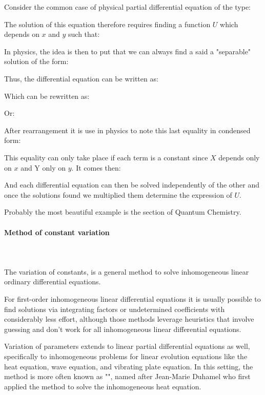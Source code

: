 	Consider the common case of physical partial differential equation of the type:
	
	The solution of this equation therefore requires finding a function $U$ which depends on $x$ and $y$ such that:
	
	In physics, the idea is then to put that we can always find a said a "separable" solution of the form:
	
	Thus, the differential equation can be written as:
	
	Which can be rewritten as:
	
	Or:
	
	After rearrangement it is use in physics to note this last equality in condensed form:
	
	This equality can only take place if each term is a constant since $X$ depends only on $x$ and Y only on $y$. It comes then:
	
	And each differential equation can then be solved independently of the other and once the solutions found we multiplied them determine the expression of $U$.
	\begin{tcolorbox}[title=Remark,colframe=black,arc=10pt]
	Probably the most beautiful example is the section of Quantum Chemistry.
	\end{tcolorbox}
	
	\paragraph{Method of constant variation}\mbox{}\\\\
	The variation of constants, is a general method to solve inhomogeneous linear ordinary differential equations.

	For first-order inhomogeneous linear differential equations it is usually possible to find solutions via integrating factors or undetermined coefficients with considerably less effort, although those methods leverage heuristics that involve guessing and don't work for all inhomogeneous linear differential equations.

	Variation of parameters extends to linear partial differential equations as well, specifically to inhomogeneous problems for linear evolution equations like the heat equation, wave equation, and vibrating plate equation. In this setting, the method is more often known as "", named after Jean-Marie Duhamel who first applied the method to solve the inhomogeneous heat equation.
	
